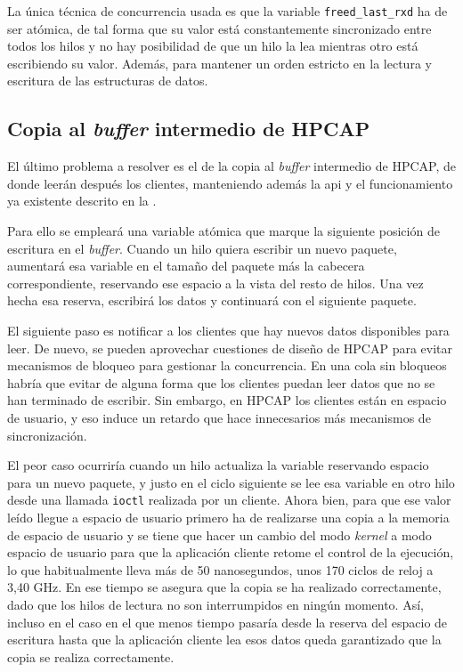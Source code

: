 \documentclass[twoside, 12pt, draft]{epstfg}
\begin{document}
La única técnica de concurrencia usada es que la variable \texttt{freed\_last\_rxd} ha de ser atómica, de tal forma que su valor está constantemente sincronizado entre todos los hilos y no hay posibilidad de que un hilo la lea mientras otro está escribiendo su valor. Además, para mantener un orden estricto en la lectura y escritura de las estructuras de datos.

\subsection{Copia al \textit{buffer} intermedio de HPCAP}

El último problema a resolver es el de la copia al \textit{buffer} intermedio de HPCAP, de donde leerán después los clientes, manteniendo además la \gls{api} y el funcionamiento ya existente descrito en la .

Para ello se empleará una variable atómica que marque la siguiente posición de escritura en el \textit{buffer}. Cuando un hilo quiera escribir un nuevo paquete, aumentará esa variable en el tamaño del paquete más la cabecera correspondiente, reservando ese espacio a la vista del resto de hilos. Una vez hecha esa reserva, escribirá los datos y continuará con el siguiente paquete.

El siguiente paso es notificar a los clientes que hay nuevos datos disponibles para leer. De nuevo, se pueden aprovechar cuestiones de diseño de HPCAP para evitar mecanismos de bloqueo para gestionar la concurrencia. En una cola sin bloqueos habría que evitar de alguna forma que los clientes puedan leer datos que no se han terminado de escribir. Sin embargo, en HPCAP los clientes están en espacio de usuario, y eso induce un retardo que hace innecesarios más mecanismos de sincronización.

El peor caso ocurriría cuando un hilo actualiza la variable reservando espacio para un nuevo paquete, y justo en el ciclo siguiente se lee esa variable en otro hilo desde una llamada \texttt{ioctl} realizada por un cliente. Ahora bien, para que ese valor leído llegue a espacio de usuario primero ha de realizarse una copia a la memoria de espacio de usuario y se tiene que hacer un cambio del modo \textit{kernel} a modo espacio de usuario para que la aplicación cliente retome el control de la ejecución, lo que habitualmente lleva más de 50 nanosegundos, unos 170 ciclos de reloj a 3,40 GHz. En ese tiempo se asegura que la copia se ha realizado correctamente, dado que los hilos de lectura no son interrumpidos en ningún momento. Así, incluso en el caso en el que menos tiempo pasaría desde la reserva del espacio de escritura hasta que la aplicación cliente lea esos datos queda garantizado que la copia se realiza correctamente.
\end{document}
